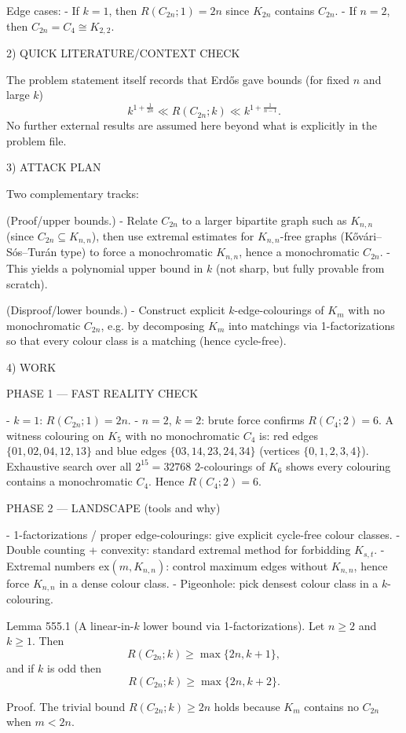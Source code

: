 Edge cases:
- If $k=1$, then $R(C_{2n};1)=2n$ since $K_{2n}$ contains $C_{2n}$.
- If $n=2$, then $C_{2n}=C_4\cong K_{2,2}$.

2) QUICK LITERATURE/CONTEXT CHECK

The problem statement itself records that Erd\H{o}s gave bounds (for fixed $n$ and large $k$)
\[
k^{1+\frac{1}{2n}}\ll R(C_{2n};k)\ll k^{1+\frac{1}{n-1}}.
\]
No further external results are assumed here beyond what is explicitly in the problem file.

3) ATTACK PLAN

Two complementary tracks:

(Proof/upper bounds.)
- Relate $C_{2n}$ to a larger bipartite graph such as $K_{n,n}$ (since $C_{2n}\subseteq K_{n,n}$), then use extremal estimates for $K_{n,n}$-free graphs (K\H{o}v\'ari--S\'os--Tur\'an type) to force a monochromatic $K_{n,n}$, hence a monochromatic $C_{2n}$.
- This yields a polynomial upper bound in $k$ (not sharp, but fully provable from scratch).

(Disproof/lower bounds.)
- Construct explicit $k$-edge-colourings of $K_m$ with no monochromatic $C_{2n}$, e.g. by decomposing $K_m$ into matchings via 1-factorizations so that every colour class is a matching (hence cycle-free).

4) WORK

PHASE 1 — FAST REALITY CHECK

- $k=1$: $R(C_{2n};1)=2n$.
- $n=2$, $k=2$: brute force confirms $R(C_4;2)=6$.
A witness colouring on $K_5$ with no monochromatic $C_4$ is:
red edges $\{01,02,04,12,13\}$ and blue edges $\{03,14,23,24,34\}$ (vertices $\{0,1,2,3,4\}$).
Exhaustive search over all $2^{15}=32768$ 2-colourings of $K_6$ shows every colouring contains a monochromatic $C_4$.
Hence $R(C_4;2)=6$.

PHASE 2 — LANDSCAPE (tools and why)

- 1-factorizations / proper edge-colourings: give explicit cycle-free colour classes.
- Double counting + convexity: standard extremal method for forbidding $K_{s,t}$.
- Extremal numbers $\mathrm{ex}(m,K_{n,n})$: control maximum edges without $K_{n,n}$, hence force $K_{n,n}$ in a dense colour class.
- Pigeonhole: pick densest colour class in a $k$-colouring.

Lemma 555.1 (A linear-in-$k$ lower bound via 1-factorizations).
Let $n\ge 2$ and $k\ge 1$.
Then
\[
R(C_{2n};k)\ge \max\{2n,k+1\},
\]
and if $k$ is odd then
\[
R(C_{2n};k)\ge \max\{2n,k+2\}.
\]

Proof.
The trivial bound $R(C_{2n};k)\ge 2n$ holds because $K_m$ contains no $C_{2n}$ when $m<2n$.

